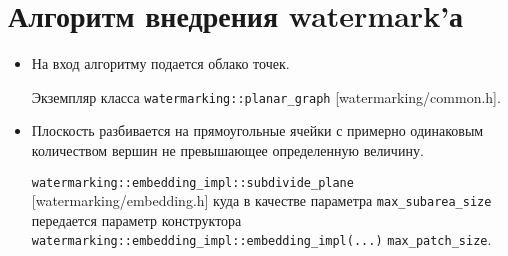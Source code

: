 \documentclass{article}
\begin{document}
\section{Алгоритм внедрения watermark'а}

\begin{itemize}
    \item На вход алгоритму подается облако точек.

    Экземпляр класса \texttt{watermarking::planar\_graph} [watermarking/common.h].

    \item Плоскость разбивается на прямоугольные ячейки с примерно одинаковым количеством вершин не превышающее определенную величину.

    \texttt{watermarking::embedding\_impl::subdivide\_plane} [watermarking/embedding.h] куда в качестве параметра \texttt{max\_subarea\_size} передается параметр конструктора \texttt{watermarking::embedding\_impl::embedding\_impl(...)} \texttt{max\_patch\_size}.

\end{itemize}
\end{document}
